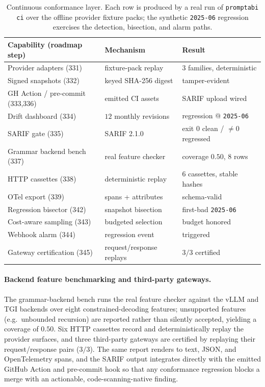 \documentclass[10pt]{article}
\begin{document}
\begin{table}[t]
\centering
\small
\begin{tabular}{lll}
\toprule
Capability (roadmap step) & Mechanism & Result \\
\midrule
Provider adapters (331) & fixture-pack replay & $3$ families, deterministic \\
Signed snapshots (332) & keyed SHA-256 digest & tamper-evident \\
GH Action / pre-commit (333,336) & emitted CI assets & SARIF upload wired \\
Drift dashboard (334) & $12$ monthly revisions & regression @ \texttt{2025-06} \\
SARIF gate (335) & SARIF 2.1.0 & exit $0$ clean / $\neq 0$ regressed \\
Grammar backend bench (337) & real feature checker & coverage $0.50$, $8$ rows \\
HTTP cassettes (338) & deterministic replay & $6$ cassettes, stable hashes \\
OTel export (339) & spans + attributes & schema-valid \\
Regression bisector (342) & snapshot bisection & first-bad \texttt{2025-06} \\
Cost-aware sampling (343) & budgeted selection & budget honored \\
Webhook alarm (344) & regression event & triggered \\
Gateway certification (345) & request/response replays & $3/3$ certified \\
\bottomrule
\end{tabular}
\caption{Continuous conformance layer. Each row is produced by a real run of
\texttt{promptabi ci} over the offline provider fixture packs; the synthetic
\texttt{2025-06} regression exercises the detection, bisection, and alarm paths.}
\label{tab:live-ci}
\end{table}

\paragraph{Backend feature benchmarking and third-party gateways.}
The grammar-backend bench runs the real feature checker against the vLLM and TGI
backends over eight constrained-decoding features; unsupported features (e.g.\
unbounded recursion) are reported rather than silently accepted, yielding a
coverage of $0.50$. Six HTTP cassettes record and deterministically replay the
provider surfaces, and three third-party gateways are certified by replaying
their request/response pairs ($3/3$). The same report renders to text, JSON, and
OpenTelemetry spans, and the SARIF output integrates directly with the emitted
GitHub Action and pre-commit hook so that any conformance regression blocks a
merge with an actionable, code-scanning-native finding.
\end{document}
